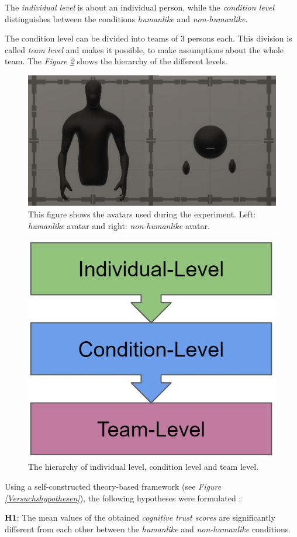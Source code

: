 \documentclass[sigchi]{acmart}
\begin{document}
The \textit{individual level} is about an individual person, while the \textit{condition level} distinguishes between the conditions \textit{humanlike} and \textit{non-humanlike}.

The condition level can be divided into teams of 3 persons each. This division is called \textit{team level} and makes it possible, to make assumptions about the whole team. 
The \textit{Figure \ref{DifferentLevels}} shows the hierarchy of the different levels.

\begin{figure}[h]
  \centering
 		\includegraphics[width=0.60\linewidth]{Abbildungen/Avatars.JPG}
			\caption[The avatars]{This figure shows the avatars used during the experiment. Left: \textit{humanlike} avatar and right: \textit{non-humanlike} avatar.}
			\label{Avatars}
\end{figure}	

\begin{figure}[h]
  \centering
 		\includegraphics[width=0.5\linewidth]{Abbildungen/DifferentLevels.JPG}	
			\caption[The hierarchy levels]{The hierarchy of individual level, condition level and team level.}
			\label{DifferentLevels}
\end{figure}	
	
Using a self-constructed theory-based framework (see \textit{Figure \ref{Versuchshypothesen}}), the following hypotheses were formulated :

\textbf{H1}: The mean values of the obtained \textit{cognitive trust scores} are significantly different from each other between the \textit{humanlike} and \textit{non-humanlike} conditions.
\end{document}
